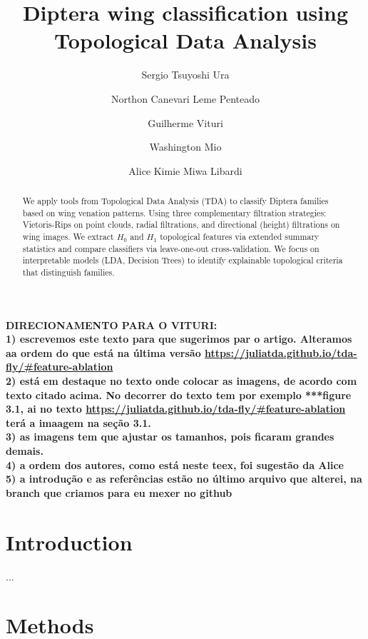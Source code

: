 \documentclass{birkjour}
\author[S. T. Ura]{Sergio Tsuyoshi Ura}
\author[N. C. L. Penteado]{Northon Canevari Leme Penteado}
\author[Vituri]{Guilherme Vituri}
\author[Mio]{Washington Mio}
\author[alice]{Alice Kimie Miwa Libardi}
\theoremstyle{definition}
\theoremstyle{remark}
\numberwithin{equation}{section}
\begin{document}
\title[Diptera wing classification using Topological Data Analysis]{Diptera wing classification using Topological Data Analysis}


\begin{abstract}
We apply tools from Topological Data Analysis (TDA) to classify Diptera families based on wing venation patterns. Using three complementary filtration strategies: Vietoris-Rips on point clouds, radial filtrations, and directional (height) filtrations on wing images. We extract \(H_0\) and \(H_1\) topological features via extended summary statistics and compare classifiers via leave-one-out cross-validation. We focus on interpretable models (LDA, Decision Trees) to identify explainable topological criteria that distinguish families.


\end{abstract}

\maketitle
{\bf DIRECIONAMENTO PARA O VITURI: 
\\
1) escrevemos este texto para que sugerimos par o artigo. Alteramos aa ordem do que está na última versão \url{https://juliatda.github.io/tda-fly/#feature-ablation} 
\\
2) está em destaque no texto onde colocar as imagens, de acordo com texto citado acima. No decorrer do texto tem por exemplo ***figure 3.1, ai no texto \url{https://juliatda.github.io/tda-fly/#feature-ablation}  terá a imaagem na seção 3.1.
\\
3) as imagens tem que ajustar os tamanhos, pois ficaram grandes demais.
\\
4) a ordem dos autores, como está neste teex, foi sugestão da Alice
\\
5) a introdução e as referências estão no último arquivo que alterei, na branch que criamos para eu mexer no github 
}

\section{Introduction}
...

\section{Methods}
\end{document}
